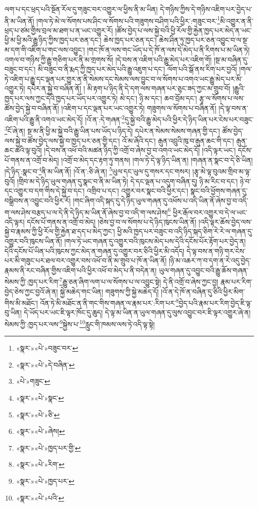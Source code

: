 ལག་པ་དང་ཕྲད་པའི་སྔོན་རོལ་དུ་གཟུང་བར་འགྱུར་ལ་ཕྱིས་ནི་མ་ཡིན། དེ་གཉིས་ཀྱིས་དེ་གཉིས་འཇིག་པར་བྱེད་པ་ནི་མ་ཡིན་ནོ། །གལ་ཏེ་མེ་ལ་སོགས་པས་ཤིང་ལ་སོགས་པའི་གཟུགས་བཤིག་པའི་ཕྱིར་:གཟུང་བར་\footnote{«སྣར་»«པེ་»བཟུང་བར་}མི་འགྱུར་ན་ནི་ཕྲད་པ་ཙམ་གྱིས་བྲལ་མ་ཐག་པ་ན་ཡང་འགྱུར་རོ། །ཚོས་བྱེད་པ་ལས་སྐྱེ་བའི་ཕྱི་རོལ་གྱི་རྐྱེན་ཁྱད་པར་མེད་ན་ཡང་ཕྱི་མ་ཕྱི་མའི་རྒྱུ་ཉིད་ཀྱིས་ཁྱད་པར་ཅན་དང་། ཆེས་ཁྱད་པར་ཅན་དང་། ཆེས་ཤིན་ཏུ་ཁྱད་པར་ཅན་འབྱུང་བ་ལ་སྔ་མ་དག་གི་འཇིག་པ་གང་ལས་འབྱུང་། །གང་ཁོ་ན་ལས་གང་ཡོད་པ་དེ་ཁོ་ན་ལས་དེ་མེད་པ་ནི་རིགས་པ་མ་ཡིན་ཏེ། འགལ་བ་གཉིས་ཀྱི་རྒྱུ་གཅིག་པར་ནི་མ་གྲགས་སོ། །དེ་བས་ན་འཇིག་པའི་རྒྱུ་མེད་པར་འཇིག་གོ། །སྔ་མ་བཞིན་དུ་བཟུང་བ་དང་། མི་བཟུང་བ་ནི་རྨད་ཀྱི་ཁྱད་པར་མེད་པའི་རྒྱུ་འཇུག་པ་དང་། ལོག་པའི་སྒོ་ནས་རིག་པར་བྱའོ། །གལ་ཏེ་འཇིག་པ་རྒྱུ་དང་ལྡན་པར་གྱུར་ན་ནི་སེམས་དང་སེམས་ལས་བྱུང་བ་ལ་སོགས་པ་འགའ་ཡང་རྒྱུ་མེད་པར་མི་འགྱུར་ཏེ། དཔེར་ན་སྐྱེ་བ་བཞིན་ནོ། །
མི་རྟག་པ་ཉིད་ནི་དེ་དག་ལས་གཞན་པར་ཅུང་ཟད་ཀྱང་མ་གྲུབ་བོ། །རྒྱུའི་ཁྱད་པར་ལས་ཀྱང་དེའི་ཁྱད་པར་ཡོད་པར་འགྱུར་ཏེ། མེ་དང་། ཉི་མ་དང་། ཆབ་བྲོམ་དང་། རྩྭ་ལ་སོགས་པ་ལས་ཚོས་བྱེད་སྐྱེ་བ་བཞིན་ནོ། །འཇིག་པ་དང་ལྡན་པར་ཡང་འགྱུར་ཏེ། གཟུགས་ལ་སོགས་པ་བཞིན་ནོ། །དེ་ལྟ་བས་ན་འཇིག་པའི་རྒྱུ་ནི་འགའ་ཡང་མེད་དོ། །འོ་ན་:དེ་གཞན་\footnote{«སྣར་»«པེ་»དེ་བཞིན་}དུ་སྐྱེ་བའི་རྒྱུ་མེད་པའི་ཕྱིར་དེ་ཉིད་ཡིན་པར་ངེས་པར་བཟུང་\footnote{«པེ་»གཟུང་}ངོ་ཞེ་ན། སྔ་མ་ནི་ཕྱི་མ་སྐྱེ་བའི་རྒྱུ་ཡིན་པས་ཡོད་པ་ཉིད་དེ། དཔེར་ན་སེམས་སེམས་གཞན་གྱི་དང་། ཚོས་བྱེད་ལས་སྐྱེ་བ་ཚོས་བྱེད་ལས་སྐྱེ་བ་ཁྱད་པར་ཅན་གྱི་དང་། འོ་མ་ཞོའི་དང་། རྒུན་འབྲུའི་ཁུ་བ་རྒུན་ཆང་གི་དང་། རྒུན་ཆང་ཚའི་ལྟ་བུའོ། །དེ་བས་ན་འཕོ་བའི་མཚན་ཉིད་ཀྱི་འགྲོ་བ་ཞེས་བྱ་བ་འགའ་ཡང་མེད་དོ། །འདི་ལྟར་ཡང་། དངོས་པོ་གནས་ན་འགྲོ་བ་མེད། །འགྲོ་བ་མེད་དང་རྟག་ཏུ་གནས། །གལ་ཏེ་དེ་ལྟ་ཉིད་ཡིན་ན། །གཞན་ན་སྣང་བ་དེ་ཅི་ཡིན། །དེ་ཉིད་:སྣང་བ་\footnote{«སྣར་»«པེ་»སྣང་}ནི་མ་ཡིན་ནོ། །འོ་ན་:ཅི་ཞེ་ན། \footnote{«སྣར་»«པེ་»ཅི་}ཡུལ་དང་ཡུལ་དུ་གསར་དང་གསར། །རྩྭ་མེ་ལྟ་བུའམ་གྲིབ་མ་ལྟ་བུའོ། །གྲིབ་མ་དེ་ཉིད་ཡུལ་གཞན་དུ་སྣང་བ་ནི་མ་ཡིན་ཏེ། དེ་དང་ལྡན་པ་འདུག་བཞིན་དུ། ཉི་མ་རིང་བ་དང་། ཉེ་བ་དང་འགྱུར་བ་དག་གིས་དེ་སྐྱེ་བ་དང་། འགྲིབ་པ་དང་། འགྱུར་བར་སྣང་བའི་ཕྱིར་དང་། སྣང་བའི་ཕྱོགས་གཞན་དུ་བསྒྲིབས་ན་འབྱུང་བའི་ཕྱིར་རོ། །གང་ཞིག་འདི་སྐད་དུ་དེ་ཉིད་ཡུལ་གཞན་དུ་འཕོས་པ་འདི་ཡིན་ནོ་ཞེས་བྱ་བ་འདི་ག་ལས་ཤེས་བརྩད་པ་ལ་དེ་ནི་དེ་ཉིད་མ་ཡིན་ནོ་ཞེས་བྱ་བ་འདི་ག་ལས་ཤེས།\footnote{«སྣར་»«པེ་»ཞེས།} ཕྱིར་རྒོལ་བར་འགྱུར་བ་དེ་ལ་ཡང་འདི་ལྟར། དངོས་པོ་གནས་ན་འགྲོ་བ་མེད། །ཅེས་བྱ་བ་ལ་སོགས་པ་དེ་ཉིད་ཁུངས་ཡིན་ནོ། །འདི་ལྟར་ཆོས་བྱེད་ལས་སྐྱེ་བ་རྣམས་ཀྱི་ཕྱི་རོལ་གྱི་རྐྱེན་ཐ་དད་པ་མེད་ཀྱང་། ཕྱི་མའི་ཁྱད་པར་བཟུང་བ་འདི་ཉིད་སྐད་ཅིག་རེ་རེ་ལ་གཞན་དུ་འགྱུར་བའི་ཁུངས་ཡིན་ནོ། །གལ་ཏེ་ཡང་གཞན་དུ་འགྱུར་བའི་ཁུངས་མེད་པས་དེའི་དངོས་པོར་རྟོག་པར་བྱེད་ན། དེའི་དངོས་པོ་ཡིན་པའི་ཁུངས་ཀྱང་མེད་ན་གཞན་དུ་འགྱུར་བར་ཅིའི་ཕྱིར་མི་འདོད། དེ་ལྟ་བས་ན་གཉི་གར་ངེས་པར་མི་གཟུང་པར་ཐལ་བར་འགྱུར་བས་འཕོ་བ་ནི་མ་གྲུབ་པ་ཁོ་ན་ཡིན་ནོ། །ཉི་མ་འཆར་ཀ་བ་དག་ན་རེ་འདུ་བྱེད་རྣམས་ནི་རང་བཞིན་གྱིས་འཇིག་པའི་ཕྱིར་འཕོ་བ་མེད་པ་ནི་བདེན་ན། ཡུལ་གཞན་དུ་འབྱུང་བའི་རྒྱུ་ཆོས་གཞན་སེམས་ཀྱི་:ཁྱད་པར་རིག་\footnote{«སྣར་»«པེ་»ཁྱད་པར་གྱི་}རྒྱུ་ཅན་ཞིག་ལག་པ་ལ་སོགས་པ་ལ་འབྱུང་སྟེ། དེ་ནི་འགྲོ་བ་ཞེས་ཀྱང་བྱ། རྣམ་པར་རིག་བྱེད་ཅེས་ཀྱང་བྱའོ་ཞེ་ན། སྐྱེ་མཆེད་གང་ཡིན། གཟུགས་ཀྱི་སྐྱེ་མཆེད་དོ། །འོ་ན་དེ་ཁོ་ན་བཞིན་དུ་ཅིའི་ཕྱིར་མིག་གིས་མི་མཐོང་། འོན་ཏེ་མི་མཐོང་ན་ནི་གང་གིས་གཞན་ལ་རྣམ་པར་:རིག་པར་\footnote{«སྣར་»«པེ་»རིག་}བྱེད་པའི་རྣམ་པར་རིག་བྱེད་ཇི་ལྟ་བུ་ཡིན། དེ་ཡོད་པར་ཡང་ཇི་ལྟར་ཁོང་དུ་ཆུད། དེ་ལྟ་མ་ཡིན་ན་ཡུལ་གཞན་དུ་ལུས་འབྱུང་བར་ཇི་ལྟར་འགྱུར་ཞེ་ན། སེམས་ཀྱི་:ཁྱད་པར་ལས་\footnote{«སྣར་»«པེ་»ཁྱད་པར་}སྐྱེས་པ་\footnote{«སྣར་»«པེ་»པའི་}རླུང་གི་ཁམས་ལས་ཏེ་འདི་ལྟ་སྟེ། 